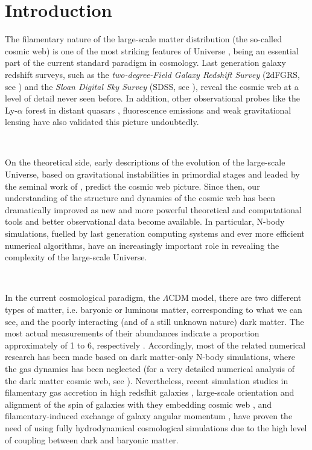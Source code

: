 \documentclass[a4,useAMS,usenatbib,usegraphicx,12pt]{article}
\begin{document}
\newpage

\section{Introduction}


The filamentary nature of the large-scale matter distribution (the so-called 
cosmic web) is one of the most striking features of Universe \citep{Bond96}, 
being an essential part of the current standard paradigm in cosmology. Last 
generation galaxy redshift surveys, such as the \textit{two-degree-Field Galaxy 
Redshift Survey} (2dFGRS, see \citet{Colless03}) and the \textit{Sloan Digital 
Sky Survey} (SDSS, see \citet{Abazajian09}), reveal the cosmic web at a level 
of detail never seen before. In addition, other observational probes like the 
Ly-$\alpha$ forest in distant quasars \citep{Rauch98, Cantalupo14}, 
fluorescence emissions \citep{Cantalupo12} and weak gravitational lensing 
\citep{Massey07, Dietrich12} have also validated this picture undoubtedly.

\

On the theoretical side, early descriptions of the evolution of the large-scale
Universe, based on gravitational instabilities in primordial stages and leaded 
by the seminal work of \citet{Zeldovich70}, predict the cosmic web picture. 
Since then, our understanding of the structure and dynamics of the cosmic web 
has been dramatically improved as new and more powerful theoretical and 
computational tools and better observational data become available. In 
particular, N-body simulations, fuelled by last generation computing systems 
and ever more efficient numerical algorithms, have an increasingly important 
role in revealing the complexity of the large-scale Universe.

\

In the current cosmological paradigm, the $\Lambda$CDM model, there are two 
different types of matter, i.e. baryonic or luminous matter, corresponding 
to what we can see, and the poorly interacting (and of a still unknown nature) 
dark matter. The most actual measurements of their abundances indicate a 
proportion approximately of 1 to 6, respectively \citep{Planck13XVI}. 
Accordingly, most of the related numerical research has been made based on 
dark matter-only N-body simulations, where the gas dynamics has been 
neglected (for a very detailed numerical analysis of the dark matter cosmic 
web, see \citet{Cautun14}). Nevertheless, recent simulation studies in 
filamentary gas accretion in high redsfhit galaxies \citep{Dekel09}, 
large-scale orientation and alignment of the spin of galaxies with they 
embedding cosmic web \citep{Hahn10}, and filamentary-induced exchange of 
galaxy angular momentum \citep{Dubois14}, have proven the need of using 
fully hydrodynamical cosmological simulations due to the high level of coupling
between dark and baryonic matter.
\end{document}
